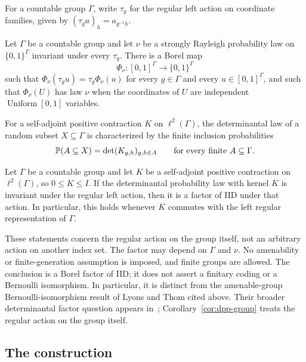 For a countable group $\Gamma$, write $\tau_g$ for the regular left action
on coordinate families, given by $(\tau_g a)_h=a_{g^{-1}h}$.

\begin{theorem}
\label{thm:sr-group}
Let $\Gamma$ be a countable group and let $\nu$ be a strongly Rayleigh
probability law on $\{0,1\}^{\Gamma}$ invariant under every $\tau_g$.
There is a Borel map
\[
 \Phi_\nu:[0,1]^{\Gamma}\longrightarrow\{0,1\}^{\Gamma}
\]
such that $\Phi_\nu(\tau_g u)=\tau_g\Phi_\nu(u)$ for every $g\in\Gamma$
and every $u\in[0,1]^{\Gamma}$, and such that $\Phi_\nu(U)$ has law $\nu$
when the coordinates of $U$ are independent $\operatorname{Uniform}[0,1]$
variables.
\end{theorem}

For a self-adjoint positive contraction $K$ on $\ell^2(\Gamma)$, the
determinantal law of a random subset $X\subseteq\Gamma$ is characterized
by the finite inclusion probabilities
\[
 \P(A\subseteq X)=\det(K_{g,h})_{g,h\in A}
 \qquad\text{for every finite }A\subseteq\Gamma.
\]

\begin{corollary}
\label{cor:dpp-group}
Let $\Gamma$ be a countable group and let $K$ be a self-adjoint positive
contraction on $\ell^2(\Gamma)$, so $0\le K\le I$. If the determinantal
probability law with kernel $K$ is invariant under the regular left action,
then it is a factor of IID under that action. In particular, this holds
whenever $K$ commutes with the left regular representation of $\Gamma$.
\end{corollary}

These statements concern the regular action on the group itself, not an
arbitrary action on another index set. The factor may depend on $\Gamma$
and $\nu$. No amenability or finite-generation assumption is imposed, and
finite groups are allowed. The conclusion is a Borel factor of IID; it
does not assert a finitary coding or a Bernoulli isomorphism. In particular,
it is distinct from the amenable-group Bernoulli-isomorphism result of
Lyons and Thom cited above. Their broader determinantal factor question
appears in~\cite[Question~7.7]{LyonsThom2016}; Corollary~\ref{cor:dpp-group}
treats the regular action on the group itself.

\subsection{The construction}

